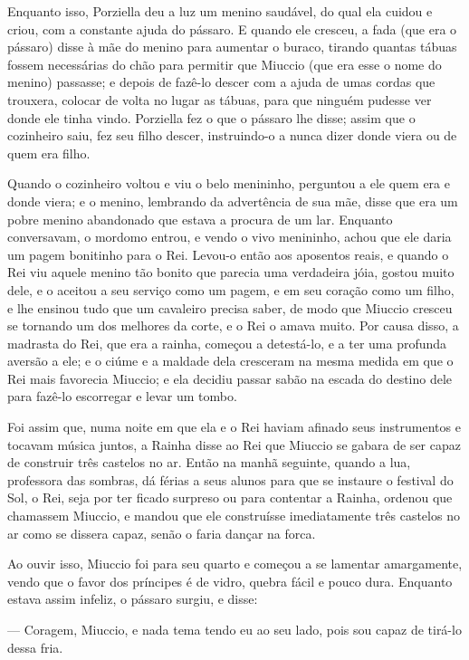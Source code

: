Enquanto isso, Porziella deu a luz um menino saudável, do qual ela
cuidou e criou, com a constante ajuda do pássaro. E quando ele
cresceu, a fada (que era o pássaro) disse à mãe do menino para
aumentar o buraco, tirando quantas tábuas fossem necessárias do chão
para permitir que Miuccio (que era esse o nome do menino) passasse; e
depois de fazê-lo descer com a ajuda de umas cordas que trouxera,
colocar de volta no lugar as tábuas, para que ninguém pudesse ver
donde ele tinha vindo. Porziella fez o que o pássaro lhe disse; assim
que o cozinheiro saiu, fez seu filho descer, instruindo-o a nunca
dizer donde viera ou de quem era filho.

Quando o cozinheiro voltou e viu o belo menininho, perguntou a ele
quem era e donde viera; e o menino, lembrando da advertência de sua
mãe, disse que era um pobre menino abandonado que estava a procura de
um lar. Enquanto conversavam, o mordomo entrou, e vendo o vivo
menininho, achou que ele daria um pagem bonitinho para o Rei. Levou-o
então aos aposentos reais, e quando o Rei viu aquele menino tão
bonito que parecia uma verdadeira jóia, gostou muito dele, e o
aceitou a seu serviço como um pagem, e em seu coração como um filho,
e lhe ensinou tudo que um cavaleiro precisa saber, de modo que
Miuccio cresceu se tornando um dos melhores da corte, e o Rei o amava
muito. Por causa disso, a madrasta do Rei, que era a rainha, começou
a detestá-lo, e a ter uma profunda aversão a ele; e o ciúme e a
maldade dela cresceram na mesma medida em que o Rei mais favorecia
Miuccio; e ela decidiu passar sabão na escada do destino dele para
fazê-lo escorregar e levar um tombo. 

Foi assim que, numa noite em que ela e o Rei haviam afinado seus
instrumentos e tocavam música juntos, a Rainha disse ao Rei que
Miuccio se gabara de ser capaz de construir três castelos no ar.
Então na manhã seguinte, quando a lua, professora das sombras, dá
férias a seus alunos para que se instaure o festival do Sol, o Rei,
seja por ter ficado surpreso ou para contentar a Rainha, ordenou que
chamassem Miuccio, e mandou que ele construísse imediatamente três
castelos no ar como se dissera capaz, senão o faria dançar na forca.

Ao ouvir isso, Miuccio foi para seu quarto e começou a se lamentar
amargamente, vendo que o favor dos príncipes é de vidro, quebra fácil
e pouco dura. Enquanto estava assim infeliz, o pássaro surgiu, e
disse:

— Coragem, Miuccio, e nada tema tendo eu ao seu lado, pois sou capaz
de tirá-lo dessa fria. 

